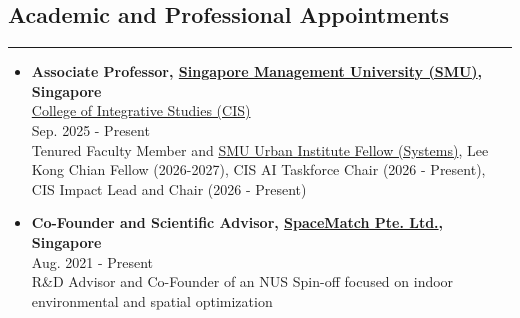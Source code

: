 \documentclass[10pt,a4paper]{article}
\begin{document}
\begin{small}
\subsection*{Academic and Professional Appointments}
\hrule
\vspace{0.2cm}
\begin{itemize}

\item 
{\bf Associate Professor, \href{https://www.smu.edu.sg/}{Singapore Management University (SMU)}, Singapore}\\
\href{https://cis.smu.edu.sg/}{College of Integrative Studies (CIS)}\\
Sep. 2025 - Present\\
Tenured Faculty Member and \href{https://urban.smu.edu.sg/}{SMU Urban Institute Fellow (Systems)}, Lee Kong Chian Fellow (2026-2027), CIS AI Taskforce Chair (2026 - Present), CIS Impact Lead and Chair (2026 - Present)

\item 
{\bf Co-Founder and Scientific Advisor, \href{https://www.spacematch.me}{SpaceMatch Pte. Ltd.}, Singapore}\\
Aug. 2021 - Present\\
R\&D Advisor and Co-Founder of an NUS Spin-off focused on indoor environmental and spatial optimization


\end{itemize}
\end{small}
\end{document}
